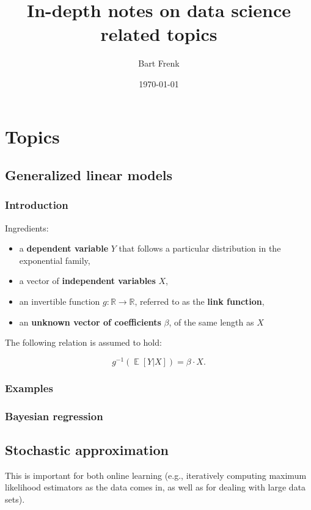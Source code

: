\documentclass[11pt]{article}
\author{Bart Frenk}
\date{\today}
\title{In-depth notes on data science related topics}
\renewcommand{\em}[1]{\textbf{#1}}
\newcommand{\E}[1]{\operatorname{\mathbb{E}}[#1]}
\begin{document}
\maketitle

\section{Topics}
\label{sec-1}
\subsection{Generalized linear models}
\label{sec-1-1}
\subsubsection{Introduction}
\label{sec-1-1-1}

Ingredients:

\begin{itemize}
\item a \em{dependent variable} $Y$ that follows a particular distribution in the exponential family,
\item a vector of \em{independent variables} $X$,
\item an invertible function $g: \mathbb{R} \rightarrow \mathbb{R}$, referred to as the \em{link function},
\item an \em{unknown vector of coefficients} $\beta$, of the same length as $X$
\end{itemize}

The following relation is assumed to hold:

\begin{equation}
g^{-1}(\E{Y|X}) = \beta \cdot X.
\end{equation}

\subsubsection{Examples}
\label{sec-1-1-2}

\subsubsection{Bayesian regression}
\label{sec-1-1-3}
\subsection{Stochastic approximation}
\label{sec-1-2}
This is important for both online learning (e.g., iteratively computing maximum
likelihood estimators as the data comes in, as well as for dealing with large
data sets).
\end{document}
